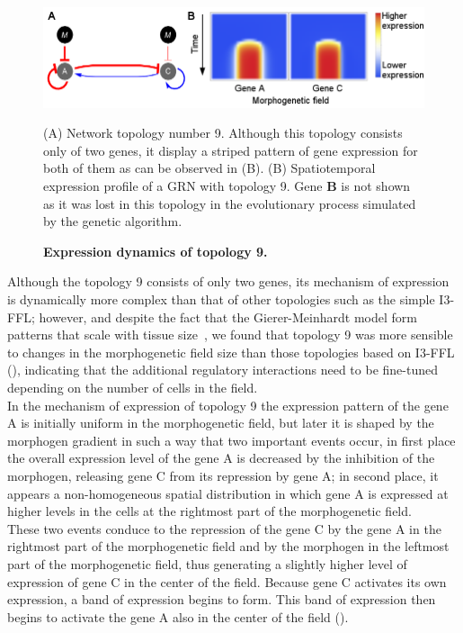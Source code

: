 \documentclass[10pt,letterpaper]{article}
\begin{document}
\begin{figure}[!h]
 \includegraphics[width=\textwidth]{figures/results/Fig8}
 \caption{\bf Expression dynamics of topology 9.}
 (A) Network topology number 9. Although this topology consists only of two
 genes, it display a striped pattern of gene expression for both of them as
 can be observed in (B). (B) Spatiotemporal expression profile of a GRN
 with topology 9. Gene \textbf{B} is not shown as it was lost in this topology
 in the evolutionary process simulated by the genetic algorithm.
 \label{fig:topol9}
\end{figure}

Although the topology 9 consists of only two genes, its mechanism of expression
is dynamically more complex than that of other topologies such as the simple
I3-FFL; however, and despite the fact that the Gierer-Meinhardt model form
patterns that scale with tissue size~\cite{shoaf1984}, we found that topology 9
was more sensible to changes in the morphogenetic field size than those
topologies based on I3-FFL (),
indicating that the additional regulatory interactions need to be fine-tuned
depending on the number of cells in the field.\\

In the mechanism of expression of topology 9 the expression pattern of the
gene A is initially uniform in the
morphogenetic field, but later it is shaped by the morphogen gradient in such a
way that two important events occur, in first place the overall expression
level of the gene A is decreased by the inhibition of the morphogen, releasing
gene C from its repression by gene A; in second place, it appears a
non-homogeneous spatial distribution in which gene A is expressed at higher
levels in the cells at the rightmost part of the morphogenetic field.\\

These two events conduce to the repression of the gene C by the gene A in the
rightmost part of the morphogenetic field and by the morphogen in the leftmost
part of the morphogenetic field, thus generating a slightly higher level of
expression of gene C in the center of the field. Because gene C activates its
own expression, a band of expression begins to form. This band of expression
then begins to activate the gene A also in the center of the field
().
\end{document}
